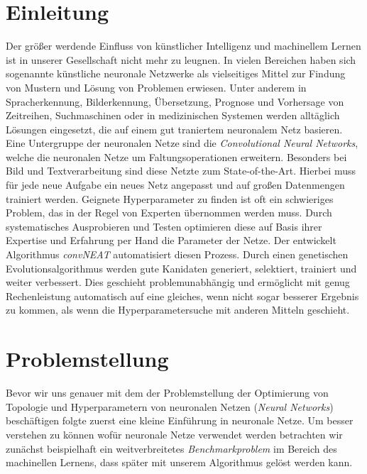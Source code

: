 \documentclass[]{scrartcl}
\begin{document}
	
	\thispagestyle{empty}
	\pagestyle{empty}
	\newpage
	\tableofcontents
	\newpage
	\pagestyle{plain}
	

\section{Einleitung}

	Der größer werdende Einfluss von künstlicher Intelligenz und machinellem Lernen ist in unserer Gesellschaft nicht mehr zu leugnen.
	In vielen Bereichen haben sich sogenannte künstliche neuronale Netzwerke als vielseitiges Mittel zur Findung von Mustern und Lösung von Problemen erwiesen.
	Unter anderem in Spracherkennung, Bilderkennung, Übersetzung, Prognose und Vorhersage von Zeitreihen, Suchmaschinen oder in medizinischen Systemen werden
	alltäglich Lösungen eingesetzt, die auf einem gut traniertem neuronalem Netz basieren.
	Eine Untergruppe der neuronalen Netze sind die \textit{Convolutional Neural Networks}, welche die neuronalen Netze um Faltungsoperationen erweitern.
	Besonders bei Bild und Textverarbeitung sind diese Netzte zum State-of-the-Art.
	Hierbei muss für jede neue Aufgabe ein neues Netz angepasst und auf großen Datenmengen trainiert werden.
	Geignete Hyperparameter zu finden ist oft ein schwieriges Problem, das in der Regel von Experten übernommen werden muss.
	Durch systematisches Ausprobieren und Testen optimieren diese auf Basis ihrer Expertise und Erfahrung per Hand die Parameter der Netze.
	Der entwickelt Algorithmus \textit{convNEAT} automatisiert diesen Prozess.
	Durch einen genetischen Evolutionsalgorithmus werden gute Kanidaten generiert, selektiert, trainiert und weiter verbessert.
	Dies geschieht problemunabhängig und ermöglicht mit genug Rechenleistung automatisch auf eine gleiches, wenn nicht sogar besserer Ergebnis zu kommen, als wenn die Hyperparametersuche mit anderen Mitteln geschieht.

\clearpage

	
\section{Problemstellung}

	Bevor wir uns genauer mit dem der Problemstellung der Optimierung von Topologie und Hyperparametern von neuronalen Netzen (\textit{Neural Networks}) beschäftigen folgte zuerst eine kleine Einführung in neuronale Netze.
	Um besser verstehen zu können wofür neuronale Netze verwendet werden betrachten wir zunächst beispielhaft ein weitverbreitetes \textit{Benchmarkproblem} im Bereich des machinellen Lernens,
	dass später mit unserem Algorithmus gelöst werden kann.
\end{document}
